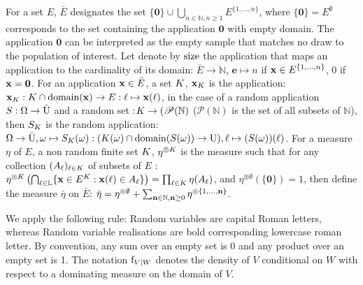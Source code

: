 For a set $E$, $\bar{E}$ designates the set $\{\mathbf{0}\}\cup\bigcup_{n\in\mathbb{N},n\geq 1} E^{\{1,\ldots,n\}}$, where $\{\mathbf{0}\}=E^\emptyset$ corresponds to the set containing the application $\mathbf{0}$ with empty domain. The application $\mathbf{0}$ can be interpreted as the empty sample that matches no draw to the population of interest. 
Let denote by $\mathrm{size} $ the application that maps an application to the cardinality of its domain: $\bar{E}\to\mathbb{N}$, $\mathbf{e}\mapsto n$ if $\mathbf{x}\in E^{\{1,\ldots,n\}}$, $0$ if $\mathbf{x}=\mathbf{0}$. For an application $\mathbf{x}\in\bar{E}$, a set $K$, $\mathbf{x}_K$ is the application:
$\mathbf{x}_K:K\cap\mathrm{domain}(\mathbf{x})\to E:\ell\mapsto\mathbf{x}(\ell)$, in the case of a random application $S:\Omega\to\bar{\mathrm{U}}$ and a random set :$K\to(\mathscr{P}(\mathbb{N})$ ($\mathscr{P}(\mathbb{N})$ is the set of all subsets of $\mathbb{N}$), then $S_K$ is the random application: $\Omega\to\bar{\mathrm{U}}, 
\omega\mapsto 
S_K(\omega):(K(\omega)\cap\mathrm{domain}(S(\omega))\to \mathrm{U}),
\ell\mapsto (S(\omega))(\ell)$.
For a measure $\eta$ of $E$, a non random finite set $K$, $\eta^{\otimes K}$ is the measure such that for any collection $(A_\ell)_{\ell\in K}$ of subsets of $E$  :
$\eta^{\otimes K}\left(\bigcap_{\ell\in\mathbb{L}}\{\mathbf{x}\in E^K:\mathbf{x}(\ell)\in A_\ell\}\right)=\prod_{\ell\in K}\eta(A_\ell)$, and
$\eta^{\otimes\emptyset}(\{\mathbf{0}\})=1$, 
then define the measure $\bar{\eta}$ on $\bar{E}$: $\bar{\eta}=\eta^{\otimes\emptyset}+\sum_{\mathbf{n}\in\mathbb{N},\mathbf{n}\geq 0}\eta^{\otimes\{1,\ldots,\mathbf{n}\}}$.


We apply the following rule: Random variables are capital Roman letters, whereas Random variable realisations are bold corresponding lowercase roman letter. By convention, any sum over an empty set is 0 and any product over an empty set is 1. The notation $\mathrm{f}_{V\mid W}$ denotes the density of $V$ conditional on $W$ with respect to a dominating measure on the domain of $V$.

